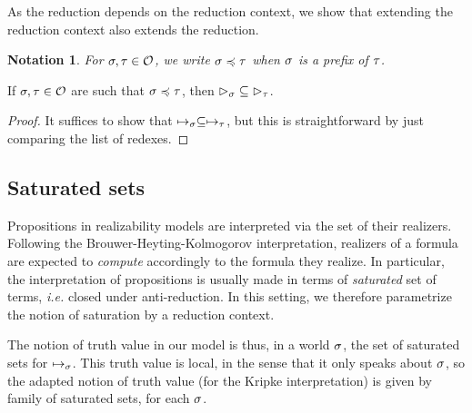 \documentclass[a4paper,UKenglish,cleveref, autoref, thm-restate]{lipics-v2021}
\newtheorem{notation}[definition]{Notation}
\begin{document}

As the reduction depends on the reduction context, we show that extending the reduction context also extends the reduction.

\begin{notation}
  For $\sigma,\tau \in \mathcal O$, we write $\sigma \preccurlyeq \tau$ when $\sigma$ is a prefix of $\tau$.

\end{notation}

\begin{proposition}
  If $\sigma, \tau \in \mathcal O$ are such that $\sigma \preccurlyeq \tau$, then $\rhd_{\sigma} \subseteq \rhd_{\tau}$.
\end{proposition}

\begin{proof}
  It suffices to show that $\mapsto_{\sigma}\subseteq \mapsto_{\tau}$, but this is straightforward by just comparing the list of redexes.
\end{proof}

\subsection{Saturated sets}
Propositions in realizability models are interpreted via the set of their realizers. Following the Brouwer-Heyting-Kolmogorov interpretation, realizers of a formula are expected to \emph{compute} accordingly to the formula they realize. In particular, the interpretation of propositions is usually made in terms of \emph{saturated} set of terms, \emph{i.e.} closed under anti-reduction.
%
In this setting, we therefore parametrize the notion of saturation by a reduction context.

The notion of truth value in our model is thus, in a world $\sigma$, the set of saturated sets for $\mapsto_{\sigma}$. This truth value is local, in the sense that it only speaks about $\sigma$, so the adapted notion of truth value (for the Kripke interpretation) is given by family of saturated sets, for each $\sigma$.
\end{document}
